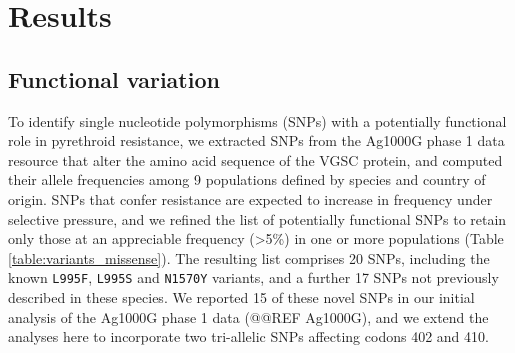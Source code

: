 \documentclass[a4paper,11pt,abstracton]{scrartcl}
\begin{document}
\section*{Results}


\subsection*{Functional variation}


%
To identify single nucleotide polymorphisms (SNPs) with a potentially functional role in pyrethroid resistance, we extracted SNPs from the Ag1000G phase 1 data resource that alter the amino acid sequence of the VGSC protein, and computed their allele frequencies among 9 populations defined by species and country of origin.
%
SNPs that confer resistance are expected to increase in frequency under selective pressure, and we refined the list of potentially functional SNPs to retain only those at an appreciable frequency (>5\%) in one or more populations (Table \ref{table:variants_missense}).
%
The resulting list comprises 20 SNPs, including the known \texttt{L995F}, \texttt{L995S} and \texttt{N1570Y} variants, and a further 17 SNPs not previously described in these species.
%
We reported 15 of these novel SNPs in our initial analysis of the Ag1000G phase 1 data (@@REF Ag1000G), and we extend the analyses here to incorporate two tri-allelic SNPs affecting codons 402 and 410.
\end{document}
